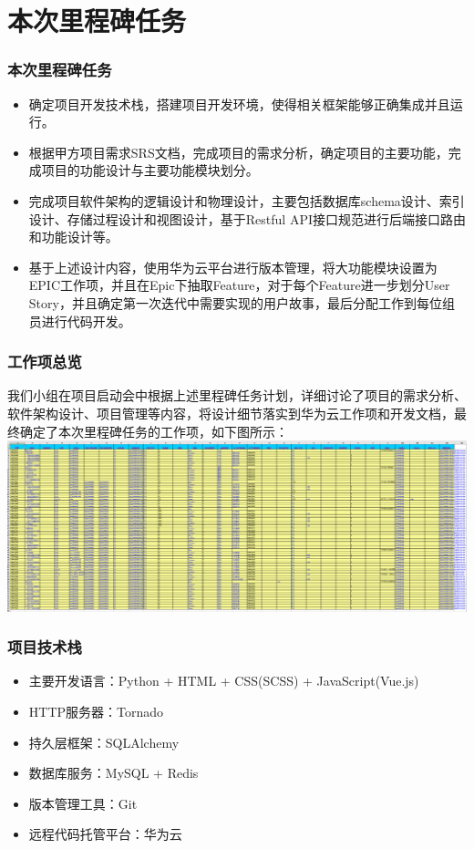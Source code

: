 \section{本次里程碑任务}
\begin{frame}
    \frametitle{本次里程碑任务}
    \begin{itemize}
        \item 确定项目开发技术栈，搭建项目开发环境，使得相关框架能够正确集成并且运行。
        \item 根据甲方项目需求SRS文档，完成项目的需求分析，确定项目的主要功能，完成项目的功能设计与主要功能模块划分。
        \item 完成项目软件架构的逻辑设计和物理设计，主要包括数据库schema设计、索引设计、存储过程设计和视图设计，基于Restful API接口规范进行后端接口路由和功能设计等。
        \item 基于上述设计内容，使用华为云平台进行版本管理，将大功能模块设置为EPIC工作项，并且在Epic下抽取Feature，对于每个Feature进一步划分User Story，并且确定第一次迭代中需要实现的用户故事，最后分配工作到每位组员进行代码开发。
    \end{itemize}
\end{frame}

\begin{frame}
    \frametitle{工作项总览}
    我们小组在项目启动会中根据上述里程碑任务计划，详细讨论了项目的需求分析、软件架构设计、项目管理等内容，将设计细节落实到华为云工作项和开发文档，最终确定了本次里程碑任务的工作项，如下图所示：
        \includegraphics[width=2\textwidth]{contents/figure/work_items_overall.png}
\end{frame}


\begin{frame}
    \frametitle{项目技术栈}
    \begin{itemize}
        \item 主要开发语言：Python + HTML + CSS(SCSS) + JavaScript(Vue.js)
        \item HTTP服务器：Tornado
        \item 持久层框架：SQLAlchemy
        \item 数据库服务：MySQL + Redis
        \item 版本管理工具：Git
        \item 远程代码托管平台：华为云
    \end{itemize}
\end{frame}